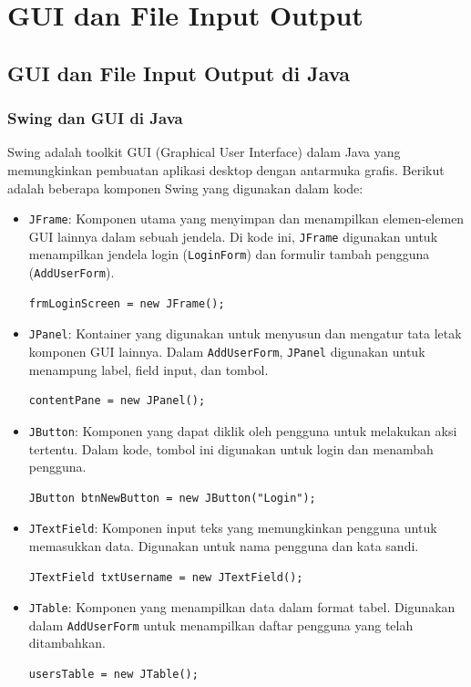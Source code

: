 \chapter{GUI dan File Input Output}

\section{GUI dan File Input Output di Java}

\subsection{Swing dan GUI di Java}

Swing adalah toolkit GUI (Graphical User Interface) dalam Java yang memungkinkan pembuatan aplikasi desktop dengan antarmuka grafis. Berikut adalah beberapa komponen Swing yang digunakan dalam kode:

\begin{itemize}
	\item \texttt{JFrame}: Komponen utama yang menyimpan dan menampilkan elemen-elemen GUI lainnya dalam sebuah jendela. Di kode ini, \texttt{JFrame} digunakan untuk menampilkan jendela login (\texttt{LoginForm}) dan formulir tambah pengguna (\texttt{AddUserForm}).
	\begin{lstlisting}[style=JavaStyle]
		frmLoginScreen = new JFrame();
	\end{lstlisting}
	
	\item \texttt{JPanel}: Kontainer yang digunakan untuk menyusun dan mengatur tata letak komponen GUI lainnya. Dalam \texttt{AddUserForm}, \texttt{JPanel} digunakan untuk menampung label, field input, dan tombol.
	\begin{lstlisting}[style=JavaStyle]
		contentPane = new JPanel();
	\end{lstlisting}
	
	\item \texttt{JButton}: Komponen yang dapat diklik oleh pengguna untuk melakukan aksi tertentu. Dalam kode, tombol ini digunakan untuk login dan menambah pengguna.
	\begin{lstlisting}[style=JavaStyle]
		JButton btnNewButton = new JButton("Login");
	\end{lstlisting}
	
	\item \texttt{JTextField}: Komponen input teks yang memungkinkan pengguna untuk memasukkan data. Digunakan untuk nama pengguna dan kata sandi.
	\begin{lstlisting}[style=JavaStyle]
		JTextField txtUsername = new JTextField();
	\end{lstlisting}
	
	\item \texttt{JTable}: Komponen yang menampilkan data dalam format tabel. Digunakan dalam \texttt{AddUserForm} untuk menampilkan daftar pengguna yang telah ditambahkan.
	\begin{lstlisting}[style=JavaStyle]
		usersTable = new JTable();
	\end{lstlisting}
\end{itemize}

